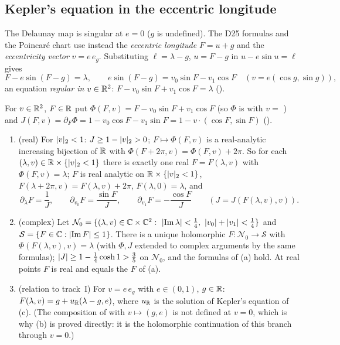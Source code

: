 \subsection{Kepler's equation in the eccentric longitude}\label{bpP:p7:sec-regular}

The Delaunay map is singular at $e=0$ ($g$ is undefined). The D25 formulas and the Poincar\'e chart use instead the \emph{eccentric longitude} $F=u+g$ and the \emph{eccentricity vector} $v=e\,e_g$.
Substituting $\ell=\lambda-g$, $u=F-g$ in $u-e\sin u=\ell$ gives
\[F-e\sin(F-g)=\lambda,\qquad e\sin(F-g)=v_0\sin F-v_1\cos F\quad(v=e(\cos g,\sin g)),\]
an equation \emph{regular in $v\in\mathbb{R}^2$}: $F-v_0\sin F+v_1\cos F=\lambda$ ().

\begin{proposition}\label{bpP:p7:regular-kepler}
For $v\in\mathbb{R}^2$, $F\in\mathbb{R}$ put $\Phi(F,v)=F-v_0\sin F+v_1\cos F$ (so $\Phi$ is  with $v=$ ) and $J(F,v)=\partial_F\Phi=1-v_0\cos F-v_1\sin F=1-v\cdot(\cos F,\sin F)$ ().
\begin{enumerate}[label=(\alph*)]
\item \textup{(real)} For $\lvert v\rvert_2<1$: $J\ge1-\lvert v\rvert_2>0$; $F\mapsto\Phi(F,v)$ is a real-analytic increasing bijection of $\mathbb{R}$ with $\Phi(F+2\pi,v)=\Phi(F,v)+2\pi$. So for each $(\lambda,v)\in\mathbb{R}\times\{\lvert v\rvert_2<1\}$ there is exactly one real $F=F(\lambda,v)$ with $\Phi(F,v)=\lambda$; $F$ is real analytic on $\mathbb{R}\times\{\lvert v\rvert_2<1\}$, $F(\lambda+2\pi,v)=F(\lambda,v)+2\pi$, $F(\lambda,0)=\lambda$, and
\[\partial_\lambda F=\frac1J,\qquad\partial_{v_0}F=\frac{\sin F}J,\qquad\partial_{v_1}F=-\frac{\cos F}J\qquad(J=J(F(\lambda,v),v)).\]
\item \textup{(complex)} Let $\mathcal N_0=\{(\lambda,v)\in\C\times\C^2:\ \abs{\operatorname{Im}\lambda}<\tfrac14,\ \abs{v_0}+\abs{v_1}<\tfrac14\}$ and $\mathcal S=\{F\in\mathbb{C}:\lvert \operatorname{Im}F\rvert\le1\}$. There is a unique holomorphic $F:\mathcal N_0\to\mathcal S$ with $\Phi(F(\lambda,v),v)=\lambda$ (with $\Phi,J$ extended to complex arguments by the same formulas); $\lvert J\rvert\ge1-\frac14\cosh1>\frac35$ on $\mathcal N_0$, and the formulas of (a) hold. At real points $F$ is real and equals the $F$ of (a).
\item \textup{(relation to track~I)} For $v=e\,e_g$ with $e\in(0,1)$, $g\in\mathbb{R}$: $F(\lambda,v)=g+u_{\mathbb{R}}(\lambda-g,e)$, where $u_{\mathbb{R}}$ is the solution of Kepler's equation of (c). (The composition of  with $v\mapsto(g,e)$ is not defined at $v=0$, which is why (b) is proved directly: it is the holomorphic continuation of this branch through $v=0$.)
\end{enumerate}
\end{proposition}
